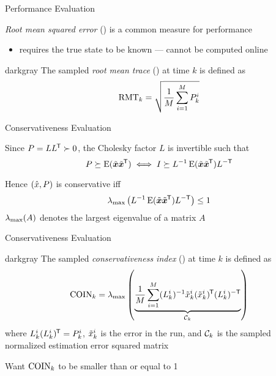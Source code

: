 \documentclass[aspectratio=1610]{beamer}
\begin{document}
\begin{frame}{Performance Evaluation}

\emph{Root mean squared error} (\abbrRMSE) is a common measure for performance
\begin{itemize}
    \item requires the true state to be known --- \alert{cannot be computed online}
\end{itemize}

\pause

\vspace{1em}

\begin{rfshadedcolorbox}[title={Root Mean Trace}]{darkgray}
    The sampled \emph{root mean trace} (\abbrRMT) at time $k$ is defined as
    \begin{equation*}
        \text{RMT}_k = \sqrt{\frac{1}{M}\sum_{i=1}^M P_k^i }
    \end{equation*}
\end{rfshadedcolorbox}



\end{frame}


\begin{frame}{Conservativeness Evaluation}

Since $P=LL^{\mkern-1.5mu\mathsf{T}}\succ0$, the Cholesky factor $L$ is invertible such that
\begin{equation*}
    P \succeq \operatorname*{\rm E}(\tilde{\bm{x}}\tilde{\bm{x}}^{\mkern-1.5mu\mathsf{T}}) \iff I \succeq L^{-1} \operatorname*{\rm E}(\tilde{\bm{x}}\tilde{\bm{x}}^{\mkern-1.5mu\mathsf{T}}) L^{-\mathsf{T}}
\end{equation*}

\vspace{1em}

Hence $(\hat{x},P)$ is conservative iff
\[
    \lambda_{\max}\left(L^{-1}\operatorname*{\rm E}(\tilde{\bm{x}}\tilde{\bm{x}}^{\mkern-1.5mu\mathsf{T}}) L^{-\mathsf{T}}\right) \leq 1
\]
$\lambda_{\max}(A)$ denotes the largest eigenvalue of a matrix $A$

\end{frame}

\begin{frame}{Conservativeness Evaluation}

\begin{rfshadedcolorbox}[title={Conservativeness Index}]{darkgray}
    The sampled \emph{conservativeness index} (\abbrCOIN) at time $k$ is defined as
    \begin{equation*}
        \text{COIN}_k = \lambda_{\max}\left( \underbrace{\frac{1}{M} \sum_{i=1}^M (L_k^i)^{-1}\tilde{x}_k^i(\tilde{x}_k^i)^{\mkern-1.5mu\mathsf{T}}(L_k^i)^{-\mathsf{T}} }_{\mathcal{C}_k} \right)
    \end{equation*}
    where $L_k^i(L_k^i)^{\mkern-1.5mu\mathsf{T}}=P_k^i$, $\tilde{x}_k^i$ is the error in the \ith \abbrMC run, and $\mathcal{C}_k$ is the sampled normalized estimation error squared matrix
\end{rfshadedcolorbox}

\pause

\vspace{1em}

\alert{Want $\text{COIN}_k$ to be smaller than or equal to 1}

\end{frame}
\end{document}
